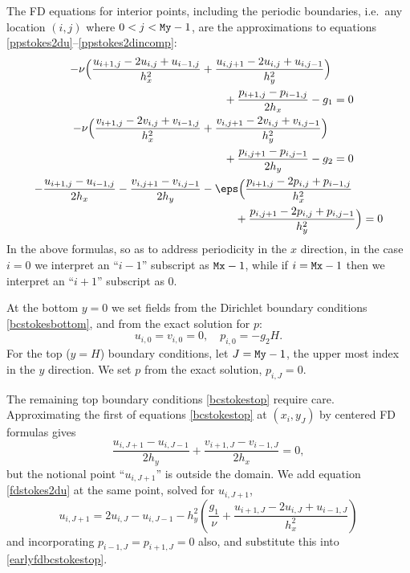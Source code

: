 The FD equations for interior points, including the periodic boundaries, i.e.~any location $(i,j)$ where $0 < j < \text{\texttt{My}}-1$, are the approximations to equations \eqref{ppstokes2du}--\eqref{ppstokes2dincomp}:
\begin{align}
-\nu \Big(\frac{u_{i+1,j} - 2 u_{i,j} + u_{i-1,j}}{h_x^2} &+ \frac{u_{i,j+1} - 2 u_{i,j} + u_{i,j-1}}{h_y^2}\Big) \notag \\
&\qquad + \frac{p_{i+1,j}-p_{i-1,j}}{2h_x} - g_1 = 0 \label{fdstokes2du} \\
-\nu \Big(\frac{v_{i+1,j} - 2 v_{i,j} + v_{i-1,j}}{h_x^2} &+ \frac{v_{i,j+1} - 2 v_{i,j} + v_{i,j-1}}{h_y^2}\Big) \notag \\
&\qquad + \frac{p_{i,j+1}-p_{i,j-1}}{2h_y} - g_2 = 0 \label{fdstokes2dv} \\
- \frac{u_{i+1,j}-u_{i-1,j}}{2h_x} - \frac{v_{i,j+1}-v_{i,j-1}}{2h_y} &- \eps \Big(\frac{p_{i+1,j} - 2 p_{i,j} + p_{i-1,j}}{h_x^2} \notag \\
&\qquad\quad + \frac{p_{i,j+1} - 2 p_{i,j} + p_{i,j-1}}{h_y^2}\Big) = 0 \label{fdstokes2dincomp}
\end{align}
In the above formulas, so as to address periodicity in the $x$ direction, in the case $i=0$ we interpret an ``$i-1$'' subscript as $\text{\texttt{Mx}}-1$, while if $i=\text{\texttt{Mx}}-1$ then we interpret an ``$i+1$'' subscript as $0$.

At the bottom $y=0$ we set fields from the Dirichlet boundary conditions \eqref{bcstokesbottom}, and from the exact solution for $p$:
\begin{equation}
  u_{i,0} = v_{i,0} = 0, \quad p_{i,0} = - g_2 H. \label{fdbcstokesbottom}
\end{equation}
For the top ($y=H$) boundary conditions, let $J=\text{\texttt{My}}-1$, the upper most index in the $y$ direction.  We set $p$ from the exact solution, $p_{i,J} = 0$.

The remaining top boundary conditions \eqref{bcstokestop} require care.  Approximating the first of equations \eqref{bcstokestop} at $(x_i,y_J)$ by centered FD formulas gives
\begin{equation}
  \frac{u_{i,J+1}-u_{i,J-1}}{2h_y} + \frac{v_{i+1,J}-v_{i-1,J}}{2h_x} = 0, \label{earlyfdbcstokestop}
\end{equation}
but the notional point ``$u_{i,J+1}$'' is outside the domain.  We add equation \eqref{fdstokes2du} at the same point, solved for $u_{i,J+1}$,
\begin{equation}
  u_{i,J+1} = 2 u_{i,J} - u_{i,J-1} - h_y^2 \left(\frac{g_1}{\nu} + \frac{u_{i+1,J} - 2 u_{i,J} + u_{i-1,J}}{h_x^2}\right) \label{earlyfdstokes2dutop} 
\end{equation}
and incorporating $p_{i-1,J}=p_{i+1,J}=0$ also, and substitute this into \eqref{earlyfdbcstokestop}.

